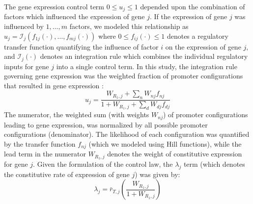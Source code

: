 \documentclass[12pt]{article}
\begin{document}
The gene expression control term $0\leq u_{j}\leq 1$ depended upon the combination of factors which influenced the expression of gene $j$.
If the expression of gene $j$ was influenced by $1,\dots,m$ factors, we modeled this relationship as
$u_{j}=\mathcal{I}_{j}\left(f_{1j}\left(\cdot\right),\hdots,f_{mj}\left(\cdot\right)\right)$
where $0\leq f_{ij}\left(\cdot\right)\leq 1$ denotes a regulatory transfer function quantifying the influence of factor $i$ on the expression of gene $j$,
and $\mathcal{I}_{j}\left(\cdot\right)$ denotes an integration rule which combines the individual regulatory inputs for gene $j$ into a single control term.
In this study, the integration rule governing gene expression was the weighted fraction of promoter configurations that resulted in gene expression \cite{Moon:2012ab}:
\begin{equation}
	{u}_{j} = \frac{W_{R_{1},j}+\displaystyle\sum_{n}W_{nj}f_{nj}}{1+W_{R_{1},j}+\displaystyle\sum_{d}W_{dj}f_{dj}}
\end{equation}
The numerator, the weighted sum (with weights $W_{nj}$) of promoter configurations leading to gene expression,
was normalized by all possible promoter configurations (denominator).
The likelihood of each configuration was quantified by the transfer function $f_{nj}$ (which we modeled using Hill functions), while
the lead term in the numerator $W_{R_{1},j}$ denotes the weight of constitutive expression for gene $j$.
Given the formulation of the control law, the $\lambda_{j}$ term (which denotes the constitutive rate of expression of gene $j$) was given by:
\begin{equation}
	\lambda_{j} = \bar{r}_{T,j}\left(\frac{W_{R_{1},j}}{1+W_{R_{1},j}}\right)
\end{equation}
\end{document}
